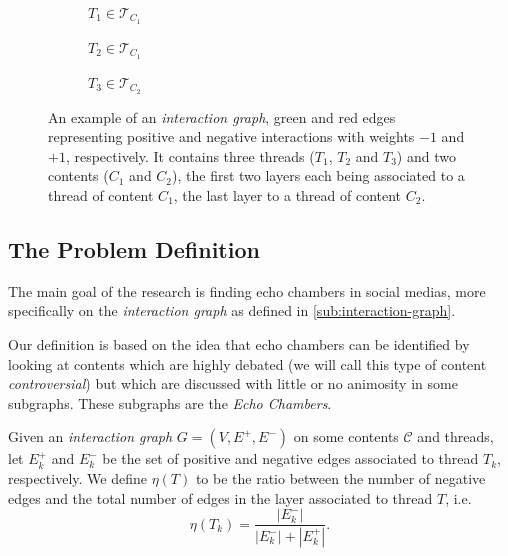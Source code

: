 \begin{figure}
	\begin{center}
		\begin{subfigure}[b]{0.3\textwidth}
			\centering
			\caption{$T_{1} \in \mathcal{T}_{C_{1}} $}
			\label{fig:tex/tikz/graph_thread1.tikz}
		\end{subfigure}
		\begin{subfigure}[b]{0.3\textwidth}
			\centering
			\caption{$T_{2} \in \mathcal{T}_{C_{1}} $}
			\label{fig:tex/tikz/graph_thread2.tikz}
		\end{subfigure}
		\begin{subfigure}[b]{0.3\textwidth}
			\centering
			\caption{$T_{3} \in \mathcal{T}_{C_{2}} $}
			\label{fig:tex/tikz/graph_thread3.tikz}
		\end{subfigure}
	\end{center}
	\caption[Example of an \emph{interaction graph}]{An example of an \emph{interaction graph}, green and red edges
		representing positive and negative interactions with weights $-1$ and
		$+1$, respectively. It
		contains three threads ($T_1$, $T_2$ and $T_3$) and two contents ($C_1$
		and $C_2$), the first two layers each being
		associated to a thread of content $C_{1} $, the last layer to a thread
		of content $C_{2} $.}
	\label{fig:interaction-graph-example}
\end{figure}

\subsection{The Problem Definition}%
\label{sub:the_problem_definition}

The main goal of the research is finding echo chambers in social medias, more
specifically on the \emph{interaction graph} as defined in
\autoref{sub:interaction-graph}.

Our definition is based on the idea that echo chambers can be identified by
looking at contents which are highly debated (we will call
this type of content \emph{controversial}) but which are discussed with little
or no animosity in some subgraphs. These subgraphs are the \emph{Echo
	Chambers}.

\bigskip

Given an \emph{interaction graph} $G = (V, E^{+}, E^{-})$ on some contents
$\mathcal{C} $ and threads, let $E^{+}_k$ and $E^{-}_k$ be the set of
positive and negative edges associated to thread $T_k$, respectively. We define
$\eta(T)$ to be the ratio between the number of
negative edges and the total number of edges in the layer associated to thread
$T$, i.e.
\begin{equation*}
	\eta(T_k) = \frac{|E^{-}_{k}|}{|E^{-}_{k}| + |E^{+}_{k}|}.
\end{equation*}

